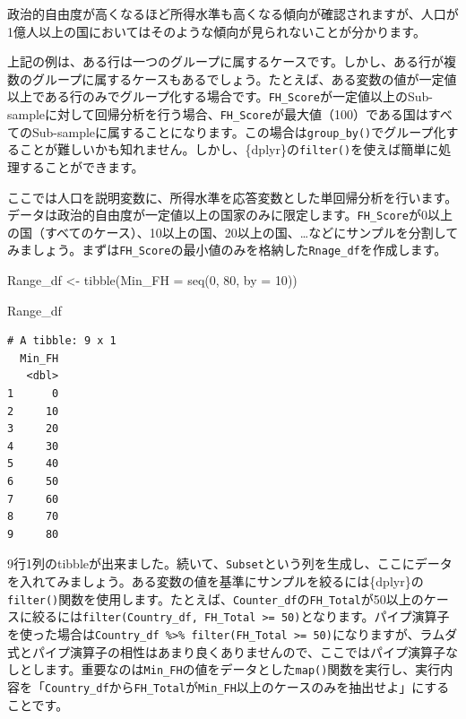 \documentclass[
  a4paper,
  pandoc,
  ja=standard,
  jafont=haranoaji]{bxjsbook}
\newenvironment{Shaded}{\begin{snugshade}}{\end{snugshade}}
\newcommand{\AttributeTok}[1]{\textcolor[rgb]{0.00,0.48,0.65}{#1}}
\newcommand{\DecValTok}[1]{\textcolor[rgb]{0.68,0.00,0.00}{#1}}
\newcommand{\FunctionTok}[1]{\textcolor[rgb]{0.28,0.35,0.67}{#1}}
\newcommand{\NormalTok}[1]{\textcolor[rgb]{0.00,0.48,0.65}{#1}}
\newcommand{\OtherTok}[1]{\textcolor[rgb]{0.00,0.48,0.65}{#1}}
\begin{document}
政治的自由度が高くなるほど所得水準も高くなる傾向が確認されますが、人口が1億人以上の国においてはそのような傾向が見られないことが分かります。

上記の例は、ある行は一つのグループに属するケースです。しかし、ある行が複数のグループに属するケースもあるでしょう。たとえば、ある変数の値が一定値以上である行のみでグループ化する場合です。\texttt{FH\_Score}が一定値以上のSub-sampleに対して回帰分析を行う場合、\texttt{FH\_Score}が最大値（100）である国はすべてのSub-sampleに属することになります。この場合は\texttt{group\_by()}でグループ化することが難しいかも知れません。しかし、\{dplyr\}の\texttt{filter()}を使えば簡単に処理することができます。

ここでは人口を説明変数に、所得水準を応答変数とした単回帰分析を行います。データは政治的自由度が一定値以上の国家のみに限定します。\texttt{FH\_Score}が0以上の国（すべてのケース）、10以上の国、20以上の国、\ldots などにサンプルを分割してみましょう。まずは\texttt{FH\_Score}の最小値のみを格納した\texttt{Rnage\_df}を作成します。

\begin{Shaded}
\begin{Highlighting}[numbers=left,,]
\NormalTok{Range\_df }\OtherTok{\textless{}{-}} \FunctionTok{tibble}\NormalTok{(}\AttributeTok{Min\_FH =} \FunctionTok{seq}\NormalTok{(}\DecValTok{0}\NormalTok{, }\DecValTok{80}\NormalTok{, }\AttributeTok{by =} \DecValTok{10}\NormalTok{))}

\NormalTok{Range\_df}
\end{Highlighting}
\end{Shaded}

\begin{verbatim}
# A tibble: 9 x 1
  Min_FH
   <dbl>
1      0
2     10
3     20
4     30
5     40
6     50
7     60
8     70
9     80
\end{verbatim}

9行1列のtibbleが出来ました。続いて、\texttt{Subset}という列を生成し、ここにデータを入れてみましょう。ある変数の値を基準にサンプルを絞るには\{dplyr\}の\texttt{filter()}関数を使用します。たとえば、\texttt{Counter\_df}の\texttt{FH\_Total}が50以上のケースに絞るには\texttt{filter(Country\_df,\ FH\_Total\ \textgreater{}=\ 50)}となります。パイプ演算子を使った場合は\texttt{Country\_df\ \%\textgreater{}\%\ filter(FH\_Total\ \textgreater{}=\ 50)}になりますが、ラムダ式とパイプ演算子の相性はあまり良くありませんので、ここではパイプ演算子なしとします。重要なのは\texttt{Min\_FH}の値をデータとした\texttt{map()}関数を実行し、実行内容を「\texttt{Country\_df}から\texttt{FH\_Total}が\texttt{Min\_FH}以上のケースのみを抽出せよ」にすることです。
\end{document}
